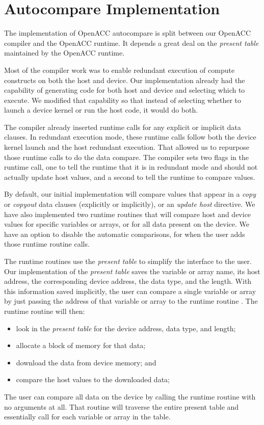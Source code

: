 \section{Autocompare Implementation}

The implementation of OpenACC autocompare is split between our OpenACC compiler and the OpenACC runtime.
It depends a great deal on the \emph{present table}\cite{wolfe.ashes.17} maintained by the OpenACC runtime.

Most of the compiler work was to enable redundant execution of compute constructs on both the host and device.
Our implementation already had the capability of generating code for both host and device and selecting which to execute.
We modified that capability so that instead of selecting whether to launch a device kernel or run the host code, it would do both.

The compiler already inserted runtime calls for any explicit or implicit data clauses.
In redundant execution mode, these runtime calls follow both the device kernel launch and the host redundant execution.
That allowed us to repurpose those runtime calls to do the data compare.
The compiler sets two flags in the runtime call, one to tell the runtime that it is in redundant mode and should not actually update host values, and a second to tell the runtime to compare values.

By default, our initial implementation will compare values that appear in a \emph{copy} or \emph{copyout} data clauses (explicitly or implicitly), or an \emph{update host} directive.
We have also implemented two runtime routines that will compare host and device values for specific variables or arrays, or for all data present on the device.
We have an option to disable the automatic comparisons, for when the user adds those runtime routine calls.

The runtime routines use the \emph{present table} to simplify the interface to the user.
Our implementation of the \emph{present table} saves the variable or array name, its host address, the corresponding device address, the data type, and the length.
With this information saved implicitly, the user can compare a single variable or array by just passing the address of that variable or array to the runtime routine .
The runtime routine will then:
\begin{itemize}
\item look in the \emph{present table} for the device address, data type, and length;
\item allocate a block of memory for that data;
\item download the data from device memory; and
\item compare the host values to the downloaded data;
\end{itemize}
The user can compare all data on the device by calling the runtime routine  with no arguments at all.
That routine will traverse the entire present table and essentially call  for each variable or array in the table.

